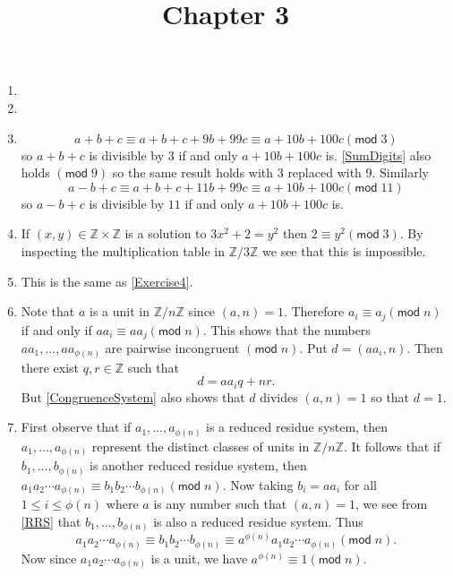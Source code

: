 \documentclass[12pt]{article}
\title{Chapter 3}
\author{}\date{}
\renewcommand{\pmod}[1]{\left(\mathsf{mod}\;#1\right)}
\begin{document}
\maketitle
\thispagestyle{empty}

\begin{enumerate}
\item %
\item %
\item %
\begin{equation}\label{SumDigits}
a+b+c\equiv a+b+c+9b+99c\equiv a+10b+100c\pmod{3}
\end{equation}
so $a+b+c$ is divisible by $3$ if and only $a+10b+100c$
is. \autoref{SumDigits} also holds $\pmod{9}$ so the
same result holds with $3$ replaced with $9$. Similarly
\[a-b+c\equiv a+b+c+11b+99c\equiv a+10b+100c\pmod{11}\]
so $a-b+c$ is divisible by $11$ if and only $a+10b+100c$ is.

\item\label{Exercise4} %
If $\left(x,y\right)\in\mathbb{Z}\times\mathbb{Z}$
is a solution to $3x^2+2=y^2$ then $2\equiv y^2\pmod{3}$.
By inspecting the multiplication table
in $\mathbb{Z}/3\mathbb{Z}$ we see
that this is impossible.

\item %
This is the same as \autoref{Exercise4}.

\item\label{RRS} %
Note that $a$ is a unit in $\mathbb{Z}/n\mathbb{Z}$
since $\left(a,n\right)=1$. Therefore
$a_i\equiv a_j\pmod{n}$ if and only if $aa_i\equiv aa_j
\pmod{n}$. This shows that
the numbers $aa_1,\ldots,aa_{\phi\left(n\right)}$
are pairwise incongruent $\pmod{n}$. Put
$d=\left(aa_i,n\right)$. Then there exist $q,r\in\mathbb{Z}$
such that
\begin{equation}\label{CongruenceSystem}
d=aa_iq+nr.\end{equation}
But \autoref{CongruenceSystem} also shows that
$d$ divides $\left(a,n\right)=1$ so that $d=1$.

\item %
First observe that if $a_1,\ldots,a_{\phi\left(n\right)}$
is a reduced residue system, then 
$a_1,\ldots,a_{\phi\left(n\right)}$ represent the distinct
classes of units in $\mathbb{Z}/n\mathbb{Z}$.
It follows that if $b_1,\ldots,b_{\phi\left(n\right)}$
is another reduced residue system, then
$a_1a_2\cdots a_{\phi\left(n\right)}
\equiv b_1b_2\cdots b_{\phi\left(n\right)}\pmod{n}$.
Now taking $b_i=aa_i$ for all $1\le i\le\phi\left(n\right)$
where $a$ is any number such that $\left(a,n\right)=1$,
we see from \autoref{RRS} that
$b_1,\ldots,b_{\phi\left(n\right)}$
is also a reduced residue system. Thus
\[a_1a_2\cdots a_{\phi\left(n\right)}
\equiv b_1b_2\cdots b_{\phi\left(n\right)}\equiv
a^{\phi\left(n\right)}a_1a_2\cdots a_{\phi\left(n\right)}
\pmod{n}.\]
Now since
$a_1a_2\cdots a_{\phi\left(n\right)}$ is a unit, we have
$a^{\phi\left(n\right)}\equiv 1\pmod{n}$.


\end{enumerate}
\end{document}
